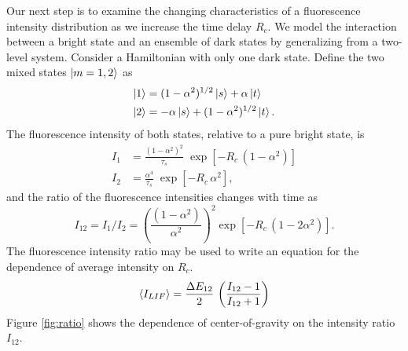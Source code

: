 \documentclass[12pt]{mitthesis}
\begin{document}
Our next step is to examine the changing characteristics of a
fluorescence intensity distribution as we increase the time delay
$R_c$.  We model the interaction between a bright state and an
ensemble of dark states by generalizing from a two-level system.
Consider a Hamiltonian with only one dark state.  Define the two mixed
states $\mathinner{|{m=1,2}\rangle}$ as
\begin{equation}
  \begin{split}
    \mathinner{|{1}\rangle} &=  (1 - \alpha^2)^{1/2} \mathinner{|{s}\rangle} + \alpha \mathinner{|{t}\rangle}\\
    \mathinner{|{2}\rangle} &= -\alpha \mathinner{|{s}\rangle} + (1 - \alpha^2)^{1/2} \mathinner{|{t}\rangle}.
  \end{split}
\end{equation}
The fluorescence intensity of both states, relative to a pure bright
state, is
\begin{equation}
  \begin{split}
    I_1 &= \frac{(1 - \alpha^2)^2}{\tau_s} \; \exp 
          \left[
            - R_c \, (1 - \alpha^2)
          \right]\\
    I_2 &= \frac{\alpha^4}{\tau_s} \; \exp 
          \left[
            - R_c \, \alpha^2
          \right],
  \end{split}
\end{equation}
and the ratio of the fluorescence intensities changes with time as
\begin{equation}
  I_{12} = I_1 / I_2 = 
  \left(
    \frac{(1 - \alpha^2)}{\alpha^2}
  \right)^2
  \exp
  \left[
    - R_c \, (1 - 2\alpha^2)
  \right].
\end{equation}
The fluorescence intensity ratio may be used to write an equation for
the dependence of average intensity on $R_c$.
\begin{equation}
  \label{eq:ratio}
  \mathinner{\langle{I_{LIF}}\rangle} = 
  \frac{\Delta E_{12}}{2} \,
  \left(
    \frac{I_{12}-1}{I_{12}+1}
  \right)
\end{equation}
Figure \ref{fig:ratio} shows the dependence of center-of-gravity on
the intensity ratio $I_{12}$.
\end{document}
